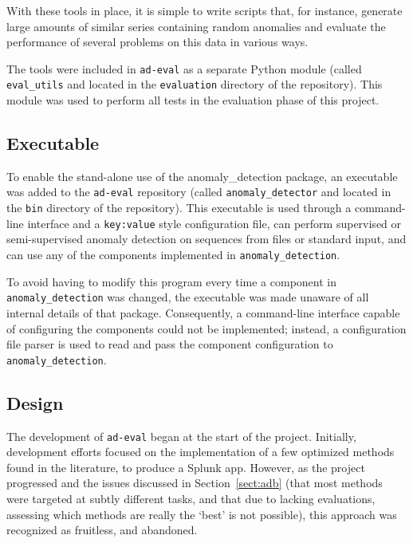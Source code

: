 With these tools in place, it is simple to write scripts that, for instance, generate large amounts of similar series containing random anomalies and evaluate the performance of several problems on this data in various ways. 

The tools were included in \texttt{ad-eval} as a separate Python module (called \texttt{eval\_utils} and located in the \texttt{evaluation} directory of the repository). This module was used to perform all tests in the evaluation phase of this project.

\subsection{Executable}
\label{sect:executable}

To enable the stand-alone use of the anomaly\_detection package, an executable was added to the \texttt{ad-eval} repository (called \texttt{anomaly\_detector} and located in the \texttt{bin} directory of the repository). This executable is used through a command-line interface and a \texttt{key:value} style configuration file, can perform supervised or semi-supervised anomaly detection on sequences from files or standard input, and can use any of the components implemented in \texttt{anomaly\_detection}.

To avoid having to modify this program every time a component in \texttt{anomaly\_detection} was changed, the executable was made unaware of all internal details of that package. Consequently, a command-line interface capable of configuring the components could not be implemented; instead, a configuration file parser is used to read and pass the component configuration to \texttt{anomaly\_detection}.

\subsection{Design}
\label{sect:design}

The development of \texttt{ad-eval} began at the start of the project. Initially, development efforts focused on the implementation of a few optimized methods found in the literature, to produce a Splunk app. However, as the project progressed and the issues discussed in Section~\ref{sect:adb} (that most methods were targeted at subtly different tasks, and that due to lacking evaluations, assessing which methods are really the `best' is not possible), this approach was recognized as fruitless, and abandoned.

